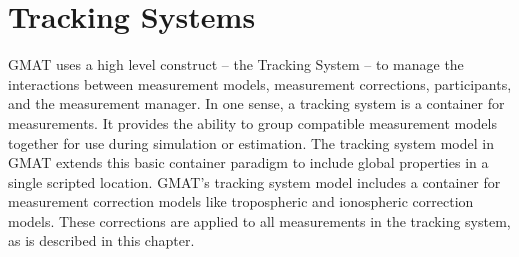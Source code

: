 \chapter{Tracking Systems}


GMAT uses a high level construct -- the Tracking System -- to manage the
interactions between measurement models, measurement corrections, participants,
and the measurement manager.  In one sense, a tracking system is a container
for measurements.  It provides the ability to group compatible measurement
models together for use during simulation or estimation.  The tracking system
model in GMAT extends this basic container paradigm to include global
properties in a single scripted location.  GMAT's tracking system model
includes a container for measurement correction models like tropospheric
and ionospheric correction models.  These corrections are applied to all
measurements in the tracking system, as is described in this chapter.

